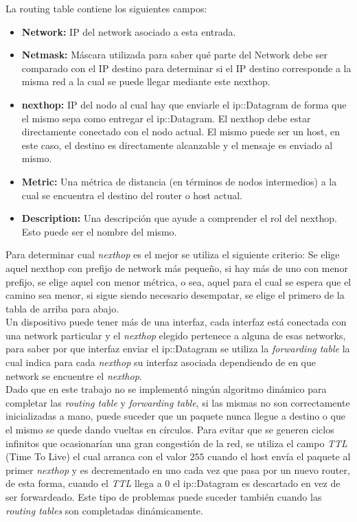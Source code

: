 \documentclass[10pt,a4paper]{article}
\begin{document}
La routing table contiene los siguientes campos:
\begin{itemize}
\item \textbf{Network:} IP del network asociado a esta entrada.
\item \textbf{Netmask:} Máscara utilizada para saber qué parte del Network debe ser comparado con el IP destino para determinar si el IP destino corresponde a la misma red a la cual se puede llegar mediante este nexthop.
\item \textbf{nexthop:} IP del nodo al cual hay que enviarle el ip::Datagram de forma que el mismo sepa como entregar el ip::Datagram. El nexthop debe estar directamente conectado con el nodo actual. El mismo puede ser un host, en este caso, el destino es directamente alcanzable y el mensaje es enviado al mismo.
\item \textbf{Metric:} Una métrica de distancia (en términos de nodos intermedios) a la cual se encuentra el destino del router o host actual.
\item \textbf{Description:} Una descripción que ayude a comprender el rol del nexthop. Esto puede ser el nombre del mismo.
\end{itemize}

Para determinar cual \textit{nexthop} es el mejor se utiliza el siguiente criterio: Se elige aquel nexthop con prefijo de network más pequeño, si hay más de uno con menor prefijo, se elige aquel con menor métrica, o sea, aquel para el cual se espera que el camino sea menor, si sigue siendo necesario desempatar, se elige el primero de la tabla de arriba para abajo. \\

Un dispositivo puede tener más de una interfaz, cada interfaz está conectada con una network particular y el \textit{nexthop} elegido pertenece a alguna de esas networks, para saber por que interfaz enviar el ip::Datagram se utiliza la \textit{forwarding table} la cual indica para cada \textit{nexthop} su interfaz asociada dependiendo de en que network se encuentre el \textit{nexthop}. \\

Dado que en este trabajo no se implementó ningún algoritmo dinámico para completar las \textit{routing table} y \textit{forwarding table}, si las mismas no son correctamente inicializadas a mano, puede suceder que un paquete nunca llegue a destino o que el mismo se quede dando vueltas en círculos. Para evitar que se generen ciclos infinitos que ocasionarían una gran congestión de la red, se utiliza el campo \textit{TTL} (Time To Live) el cual arranca con el valor $255$ cuando el host envía el paquete al primer \textit{nexthop} y es decrementado en uno cada vez que pasa por un nuevo router, de esta forma, cuando el \textit{TTL} llega a $0$ el ip::Datagram es descartado en vez de ser forwardeado. Este tipo de problemas puede suceder también cuando las \textit{routing tables} son completadas dinámicamente. \\
\end{document}
